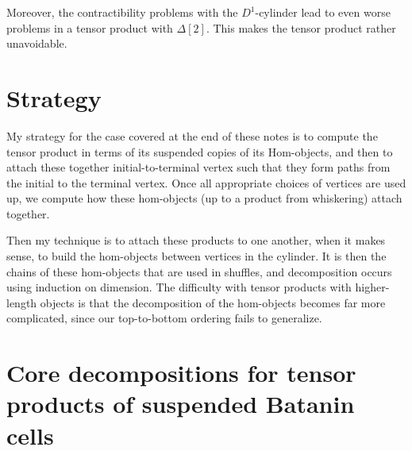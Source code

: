 \documentclass[10pt]{amsart}
\numberwithin{equation}{section}
\theoremstyle{plain}   %
\theoremstyle{remark}
\theoremstyle{plain}
\begin{document}
Moreover, the contractibility problems with the \(D^1\)-cylinder lead to even worse problems in a tensor product with \(\Delta[2]\).  This makes the tensor product rather unavoidable.



\section{Strategy}
My strategy for the case covered at the end of these notes is to compute the tensor product in terms of its suspended copies of its Hom-objects, and then to attach these together initial-to-terminal vertex such that they form paths from the initial to the terminal vertex.  Once all appropriate choices of vertices are used up, we compute how these hom-objects (up to a product from whiskering) attach together.

Then my technique is to attach these products to one another, when it makes sense, to build the hom-objects between vertices in the cylinder.  It is then the chains of these hom-objects that are used in shuffles, and decomposition occurs using induction on dimension.  The difficulty with tensor products with higher-length objects is that the decomposition of the hom-objects becomes far more complicated, since our top-to-bottom ordering fails to generalize.  

\section{Core decompositions for tensor products of suspended Batanin cells}
\end{document}
